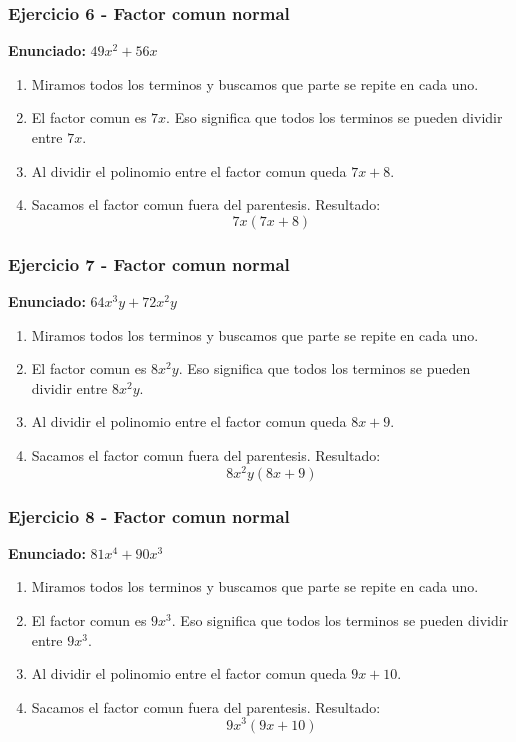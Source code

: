 \documentclass[11pt,a4paper]{article}
\begin{document}
\vspace{0.2cm}
\subsubsection*{Ejercicio 6 - Factor comun normal}
\textbf{Enunciado:} $ 49 x^{2} + 56 x $\par
\begin{enumerate}[leftmargin=2em]
\item Miramos todos los terminos y buscamos que parte se repite en cada uno.
\item El factor comun es \(7 x\). Eso significa que todos los terminos se pueden dividir entre \(7 x\).
\item Al dividir el polinomio entre el factor comun queda \(7 x + 8\).
\item Sacamos el factor comun fuera del parentesis. Resultado: \[\boxed{7 x\left(7 x + 8\right)}\]
\end{enumerate}

\vspace{0.2cm}
\subsubsection*{Ejercicio 7 - Factor comun normal}
\textbf{Enunciado:} $ 64 x^{3} y + 72 x^{2} y $\par
\begin{enumerate}[leftmargin=2em]
\item Miramos todos los terminos y buscamos que parte se repite en cada uno.
\item El factor comun es \(8 x^{2} y\). Eso significa que todos los terminos se pueden dividir entre \(8 x^{2} y\).
\item Al dividir el polinomio entre el factor comun queda \(8 x + 9\).
\item Sacamos el factor comun fuera del parentesis. Resultado: \[\boxed{8 x^{2} y\left(8 x + 9\right)}\]
\end{enumerate}

\vspace{0.2cm}
\subsubsection*{Ejercicio 8 - Factor comun normal}
\textbf{Enunciado:} $ 81 x^{4} + 90 x^{3} $\par
\begin{enumerate}[leftmargin=2em]
\item Miramos todos los terminos y buscamos que parte se repite en cada uno.
\item El factor comun es \(9 x^{3}\). Eso significa que todos los terminos se pueden dividir entre \(9 x^{3}\).
\item Al dividir el polinomio entre el factor comun queda \(9 x + 10\).
\item Sacamos el factor comun fuera del parentesis. Resultado: \[\boxed{9 x^{3}\left(9 x + 10\right)}\]
\end{enumerate}
\end{document}

